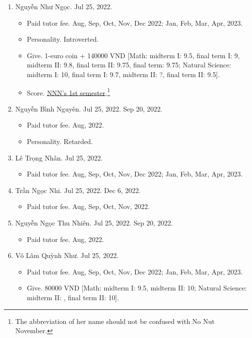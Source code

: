 \documentclass{article}
\begin{document}
\begin{enumerate}
	\item {\sc Nguyễn Như Ngọc.} {\sf[In]} Jul 25, 2022.
	\begin{itemize}
		\item {\sf Paid tutor fee.} Aug, Sep, Oct, Nov, Dec 2022; Jan, Feb, Mar, Apr, 2023.
		\item {\sf Personality.} Introverted.
		\item {\sf Give.} 1-euro coin $+$ 140000 VND [Math: midterm I: 9.5, final term I: 9, midterm II: 9.8, final term II: 9.75, final term: 9.75; Natural Science: midterm I: 10, final term I: 9.7, midterm II: ?, final term II: 9.5].
		\item {\sf Score.} \href{https://github.com/NQBH/hobby/blob/master/STEM/student/Nguyen_Nhu_Ngoc_grade_6_1st_semester.jpg}{NNN's 1st semester}.\footnote{The abbreviation of her name should not be confused with No Nut November.}
	\end{itemize}
	\item {\sc Nguyễn Bình Nguyên.} {\sf[In]} Jul 25, 2022. {\sf[Out]} Sep 20, 2022.
	\begin{itemize}
		\item {\sf Paid tutor fee.} Aug, 2022.
		\item {\sf Personality.} Retarded.
	\end{itemize}
	\item {\sc Lê Trọng Nhân.} {\sf[In]} Jul 25, 2022.
	\begin{itemize}
		\item {\sf Paid tutor fee.} Aug, Sep, Oct, Nov, Dec 2022; Jan, Feb, Mar, Apr, 2023.
	\end{itemize}
	\item {\sc Trần Ngọc Nhi.} {\sf[In]} Jul 25, 2022. {\sf[Out]} Dec 6, 2022.
	\begin{itemize}
		\item {\sf Paid tutor fee.} Aug, Sep, Oct, Nov, 2022.
	\end{itemize}
	\item {\sc Nguyễn Ngọc Thu Nhiên.} {\sf[In]} Jul 25, 2022. {\sf[Out]} Sep 20, 2022.
	\begin{itemize}
		\item {\sf Paid tutor fee.} Aug, 2022.
	\end{itemize}
	\item {\sc Võ Lâm Quỳnh Như.} {\sf[In]} Jul 25, 2022.
	\begin{itemize}
		\item {\sf Paid tutor fee.} Aug, Sep, Oct, Nov, Dec 2022; Jan, Feb, Mar, Apr, 2023.
		\item {\sf Give.} 80000 VND [Math: midterm I: 9.5, midterm II: 10; Natural Science: midterm II: , final term II: 10].

\end{itemize}
\end{enumerate}
\end{document}
